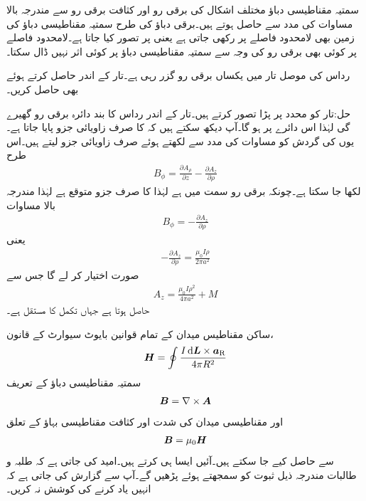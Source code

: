 سمتیہ مقناطیسی دباؤ مختلف اشکال کی برقی رو اور کثافت برقی رو سے مندرجہ بالا مساوات کی مدد سے حاصل ہوتے ہیں۔برقی دباؤ کی طرح سمتیہ مقناطیسی دباؤ کی زمین بھی لامحدود فاصلے پر رکھی جاتی ہے یعنی  پر  تصور کیا جاتا ہے۔لامحدود فاصلے پر کوئی بھی برقی رو  کی وجہ سے  سمتیہ مقناطیسی دباؤ پر کوئی اثر نہیں ڈال سکتا۔

رداس  کی موصل تار میں یکساں برقی رو  گزر رہی ہے۔تار کے اندر  حاصل کرتے ہوئے  بھی حاصل کریں۔

حل:تار کو  محدد پر پڑا تصور کرتے ہیں۔تار کے اندر  رداس کا بند دائرہ  برقی رو گھیرے گی لہٰذا اس دائرے پر  ہو گا۔آپ دیکھ سکتے ہیں کہ  کا صرف زاویائی جزو پایا جاتا ہے۔یوں  کی گردش کو مساوات  کی مدد سے لکھتے ہوئے صرف زاویائی جزو لیتے ہیں۔اس طرح
\begin{align*}
B_{\phi}=\frac{\partial A_\rho}{\partial z}-\frac{\partial A_z}{\partial \rho}
\end{align*} 
لکھا جا سکتا ہے۔چونکہ برقی رو   سمت میں ہے لہٰذا  کا صرف  جزو متوقع ہے لہٰذا مندرجہ بالا مساوات 
\begin{align*}
B_{\phi}=-\frac{\partial A_z}{\partial \rho}
\end{align*} 
یعنی
\begin{align*}
-\frac{\partial A_z}{\partial \rho}=\frac{\mu_0 I \rho}{2\pi a^2}
\end{align*}
صورت  اختیار کر لے گا جس سے
\begin{align*}
A_z= \tfrac{\mu_0 I \rho^2 }{4\pi a^2} +M
\end{align*}
حاصل ہوتا ہے جہاں  تکمل کا مستقل ہے۔

ساکن مقناطیس میدان کے تمام قوانین بایوٹ سیوارٹ کے قانون،
\begin{align}\label{مساوات_مقناطیسی_بایوٹ_سیوارٹ_قانون_بطور_ثبوت}
\kvec{H}=\oint \frac{I \dif \kvec{L} \times \aR}{4\pi R^2}
\end{align}
سمتیہ مقناطیسی دباؤ کے تعریف
\begin{align}\label{مساوات-مقناطیسی_سمتی_مقناطیسی_دباو_تعریف_دوبارہ}
{\ensuremath{{\boldsymbol{B}}}}=\nabla \times {\ensuremath{{\boldsymbol{A}}}}
\end{align}
اور مقناطیسی میدان کی شدت اور کثافت مقناطیسی  بہاؤ کے تعلق
\begin{align}\label{مساوات_مقناطیسی_شدت_اور_کثافت_بہاو_کا_تعلق}
{\ensuremath{{\boldsymbol{B}}}}=\mu_0 {{\boldsymbol{H}}}
\end{align}
سے حاصل کیے جا سکتے ہیں۔آئیں ایسا ہی کرتے  ہیں۔امید کی جاتی ہے کہ طلبہ و طالبات مندرجہ ذیل ثبوت کو سمجھتے ہوئے پڑھیں گے۔آپ سے گزارش کی جاتی ہے کہ انہیں یاد کرنے کی کوشش نہ کریں۔

